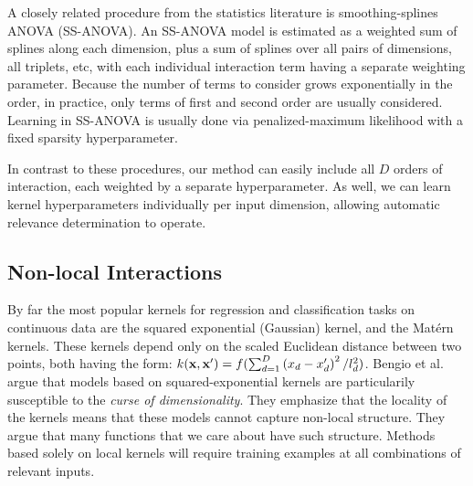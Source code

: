 A closely related procedure from the statistics literature is smoothing-splines ANOVA (SS-ANOVA)\cite{wahba1990spline}. An SS-ANOVA model is estimated as a weighted sum of splines along each dimension, plus a sum of splines over all pairs of dimensions, all triplets, etc, with each individual interaction term having a separate weighting parameter.  Because the number of terms to consider grows exponentially in the order, in practice, only terms of first and second order are usually considered.  Learning in SS-ANOVA is usually done via penalized-maximum likelihood with a fixed sparsity hyperparameter.

In contrast to these procedures, our method can easily include all $D$ orders of interaction, each weighted by a separate hyperparameter. As well, we can learn kernel hyperparameters individually per input dimension, allowing automatic relevance determination to operate.

\subsection{Non-local Interactions}

%
By far the most popular kernels for regression and classification tasks on continuous data are the squared exponential (Gaussian) kernel, and the Mat\'{e}rn kernels.  These kernels depend only on the scaled Euclidean distance between two points, both having the form: $ k({\bf x, x'}) = f(\sum_{d=1}^D \left( x_{d} - x_{d}' \right)^2 / l_d^2)$.
Bengio et al.\cite{bengio2006curse} argue that models based on squared-exponential kernels are particularily susceptible to the \textit{curse of dimensionality}.  They emphasize that the locality of the kernels means that these models cannot capture non-local structure.  They argue that many functions that we care about have such structure.  Methods based solely on local kernels will require training examples at all combinations of relevant inputs.

